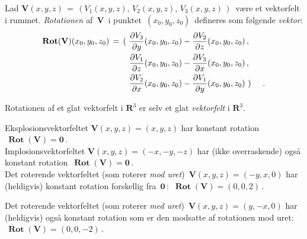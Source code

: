 \begin{definition} \label{defRot}
Lad ${\mathbf{V}}(x,y,z)\,= \, (V_{1}(x,y,z), \, V_{2}(x,y,z), \,
V_{3}(x,y,z) \,)\,$ være et vektorfelt i rummet. {\em{{Rotationen} }}
af $\,{\mathbf{V}}\,$ i punktet $\,(x_{0},y_{0},z_{0})\,$ defineres som
følgende {\em{vektor}}:
\begin{equation}
\begin{aligned}
\operatorname{\mathbf{Rot}}({\mathbf{V}})(x_{0},y_{0},z_{0}) \, = \, \Large{(} \, \,  &\frac{\partial
V_{3}}{\partial y}(x_{0},y_{0},z_{0}) - \frac{\partial
V_{2}}{\partial z}(x_{0},y_{0},z_{0})\, , \\
&\frac{\partial V_{1}}{\partial z}(x_{0},y_{0},z_{0}) -
\frac{\partial
V_{3}}{\partial x}(x_{0},y_{0},z_{0})\, , \\
&\frac{\partial V_{2}}{\partial x}(x_{0},y_{0},z_{0}) -
\frac{\partial V_{1}}{\partial y}(x_{0},y_{0},z_{0})\,\,  \Large{)} \quad .
\end{aligned}
\end{equation}
\end{definition}

\begin{think}
Rotationen  af et glat vektorfelt i $\mathbf{R}^{3}$ er selv et glat  \emph{vektorfelt} i $\mathbf{R}^{3}$.
\end{think}

\begin{example} \label{exRotationer}

Eksplosionsvektorfeltet ${\mathbf{V}}(x,y,z) = (x, y, z)$ har konstant
rotation $\,\operatorname{\mathbf{Rot}}({\mathbf{V}}) = {\mathbf{0}}\,$. \\

Implosionsvektorfeltet ${\mathbf{V}}(x,y,z) = (-x, -y, -z)$ har (ikke overraskende) også konstant
rotation $\,\operatorname{\mathbf{Rot}}({\mathbf{V}}) = {\mathbf{0}}\,$. \\


Det roterende vektorfeltet (som roterer \emph{mod uret})
$\,{\mathbf{V}}(x,y,z) = (-y, x, 0)$ har (heldigvis) konstant rotation
forskellig fra $\,{\mathbf{0}}\,$:  $\,\operatorname{\mathbf{Rot}}({\mathbf{V}}) = (0, 0, 2)\,$.

Det roterende vektorfeltet (som roterer \emph{med uret})
$\,{\mathbf{V}}(x,y,z) = (y, -x, 0)$ har (heldigvis) også konstant rotation som er den modsatte af rotationen mod uret:
 $\,\operatorname{\mathbf{Rot}}({\mathbf{V}}) = (0, 0, -2)\,$.

\end{example}


